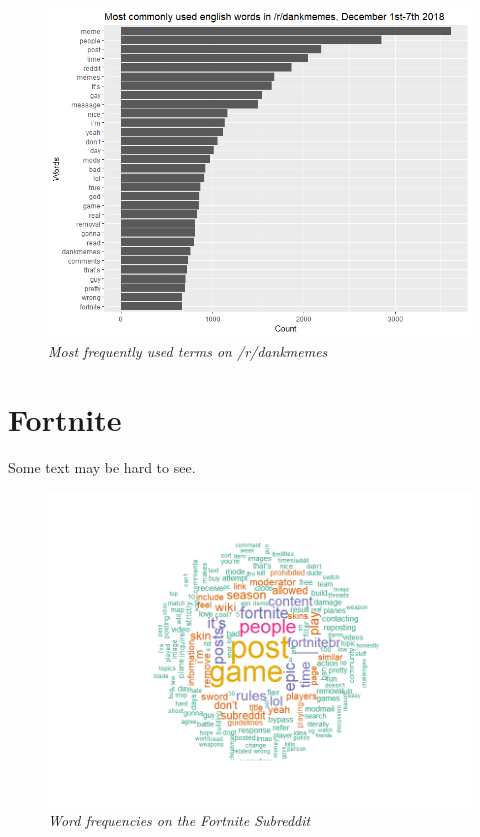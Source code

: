 \begin{figure}[H]
    \centering
    \includegraphics[width=1.0\textwidth]{graphs/DankMemes/wordfreq_rDankMemes.png}
    \caption{\textit{Most frequently used terms on /r/dankmemes}}
    \label{fig:dankmemes_wordfreq}
\end{figure}

\section{Fortnite}
\label{sec:fortnite}
Some text may be hard to see.

\begin{figure}[ht]
    \centering
    \includegraphics[width=1.0\textwidth]{graphs/Fortnite/wordcloud_Fortnite.png}
    \caption{\textit{Word frequencies on the Fortnite Subreddit}}
    \label{fig:fortnite_cloud}
\end{figure}

